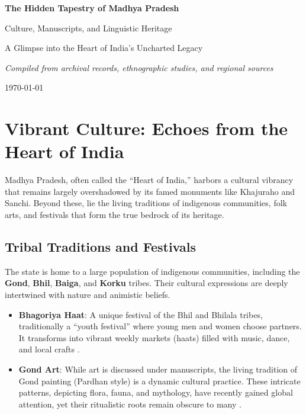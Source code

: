 \documentclass{article}
\begin{document}
\begin{titlepage}
    \centering
    \vspace*{2cm}
    {\huge\bfseries\color{mpcolor} The Hidden Tapestry of Madhya Pradesh\par}
    \vspace{1cm}
    {\Large Culture, Manuscripts, and Linguistic Heritage\par}
    \vspace{2cm}
    {\large A Glimpse into the Heart of India's Uncharted Legacy\par}
    \vfill
    {\itshape Compiled from archival records, ethnographic studies, and regional sources\par}
    \vspace{0.5cm}
    \today
\end{titlepage}

\tableofcontents
\newpage

\section{Vibrant Culture: Echoes from the Heart of India}
Madhya Pradesh, often called the ``Heart of India,'' harbors a cultural vibrancy that remains largely overshadowed by its famed monuments like Khajuraho and Sanchi. Beyond these, lie the living traditions of indigenous communities, folk arts, and festivals that form the true bedrock of its heritage.

\subsection{Tribal Traditions and Festivals}
The state is home to a large population of indigenous communities, including the \textbf{Gond}, \textbf{Bhil}, \textbf{Baiga}, and \textbf{Korku} tribes. Their cultural expressions are deeply intertwined with nature and animistic beliefs.
\begin{itemize}[leftmargin=*]
    \item \textbf{Bhagoriya Haat}: A unique festival of the Bhil and Bhilala tribes, traditionally a ``youth festival'' where young men and women choose partners. It transforms into vibrant weekly markets (haats) filled with music, dance, and local crafts \cite{elwin1964}.
    \item \textbf{Gond Art}: While art is discussed under manuscripts, the living tradition of Gond painting (Pardhan style) is a dynamic cultural practice. These intricate patterns, depicting flora, fauna, and mythology, have recently gained global attention, yet their ritualistic roots remain obscure to many \cite{jain2011}.
\end{itemize}
\end{document}
